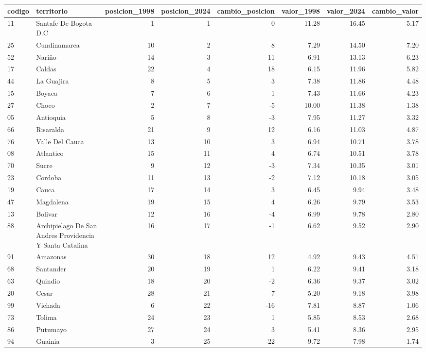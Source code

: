 \begin{tabular}{llrrrrrr}
\toprule
codigo & territorio & posicion\_1998 & posicion\_2024 & cambio\_posicion & valor\_1998 & valor\_2024 & cambio\_valor \\
\midrule
11 & Santafe De Bogota D.C & 1 & 1 & 0 & 11.28 & 16.45 & 5.17 \\
25 & Cundinamarca & 10 & 2 & 8 & 7.29 & 14.50 & 7.20 \\
52 & Nariño & 14 & 3 & 11 & 6.91 & 13.13 & 6.23 \\
17 & Caldas & 22 & 4 & 18 & 6.15 & 11.96 & 5.82 \\
44 & La Guajira & 8 & 5 & 3 & 7.38 & 11.86 & 4.48 \\
15 & Boyaca & 7 & 6 & 1 & 7.43 & 11.66 & 4.23 \\
27 & Choco & 2 & 7 & -5 & 10.00 & 11.38 & 1.38 \\
05 & Antioquia & 5 & 8 & -3 & 7.95 & 11.27 & 3.32 \\
66 & Risaralda & 21 & 9 & 12 & 6.16 & 11.03 & 4.87 \\
76 & Valle Del Cauca & 13 & 10 & 3 & 6.94 & 10.71 & 3.78 \\
08 & Atlantico & 15 & 11 & 4 & 6.74 & 10.51 & 3.78 \\
70 & Sucre & 9 & 12 & -3 & 7.34 & 10.35 & 3.01 \\
23 & Cordoba & 11 & 13 & -2 & 7.12 & 10.18 & 3.05 \\
19 & Cauca & 17 & 14 & 3 & 6.45 & 9.94 & 3.48 \\
47 & Magdalena & 19 & 15 & 4 & 6.26 & 9.79 & 3.53 \\
13 & Bolivar & 12 & 16 & -4 & 6.99 & 9.78 & 2.80 \\
88 & Archipielago De San Andres Providencia Y Santa Catalina & 16 & 17 & -1 & 6.62 & 9.52 & 2.90 \\
91 & Amazonas & 30 & 18 & 12 & 4.92 & 9.43 & 4.51 \\
68 & Santander & 20 & 19 & 1 & 6.22 & 9.41 & 3.18 \\
63 & Quindio & 18 & 20 & -2 & 6.36 & 9.37 & 3.02 \\
20 & Cesar & 28 & 21 & 7 & 5.20 & 9.18 & 3.98 \\
99 & Vichada & 6 & 22 & -16 & 7.81 & 8.87 & 1.06 \\
73 & Tolima & 24 & 23 & 1 & 5.85 & 8.53 & 2.68 \\
86 & Putumayo & 27 & 24 & 3 & 5.41 & 8.36 & 2.95 \\
94 & Guainia & 3 & 25 & -22 & 9.72 & 7.98 & -1.74 \\

\end{tabular}
